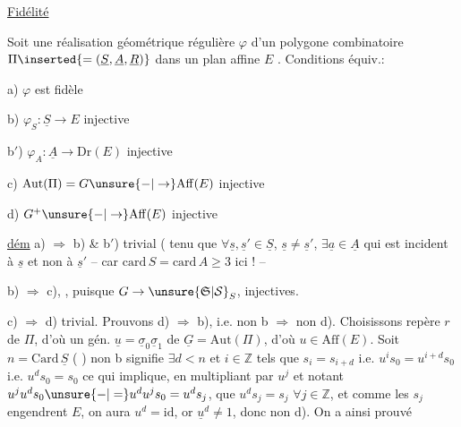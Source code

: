 \begin{center}\uline{Fidélité}\end{center}

  Soit une réalisation géométrique
régulière $\varphi$  d'un polygone combinatoire
$\Pi\inserted{=(\underline S,\underline A,\underline R)}$ dans un plan affine $E$ . Conditions équiv.:

a) $\varphi$ est fidèle

b) $\varphi_S:\underline S\to E$ injective

b$'$) $\varphi_A:\underline A\to\mathrm{Dr}(E)$ injective

c) $\mathrm{Aut}(\Pi)=G\unsure{-|\to}\mathrm{Aff}(E)$ injective

d) 
 $G^+\unsure{-|\to}\mathrm{Aff}(E)$ injective

\uline{dém} a) $\Rightarrow$ b) \& b$'$) trivial ( tenu que
$\forall\underline s,\underline s'\in\underline S$, $\underline s\ne\underline s'$, $\exists\underline a\in\underline A$ qui est incident à $\underline s$ et
non à $\underline s'$ -- car $\mathrm{card}\,S=\mathrm{card}\,A\geq3$ ici ! -- 

b) $\Rightarrow$ c),  , puisque $G\to\unsure{\mathfrak S|\mathcal S}_S$,  injectives.

 c) $\Rightarrow$ d) trivial. Prouvons
d) $\Rightarrow$ b), i.e. non b $\Rightarrow$ non d). Choisissons
 repère $r$ de $\Pi$, d'où un gén.
 $\underline u=\underline\sigma_0\underline\sigma_1$ de $\underline G=\mathrm{Aut}(\Pi)$, d'où $u\in\mathrm{Aff}(E)$.
 Soit $n=\mathrm{Card}\,\underline S$ ( )
  non b signifie $\exists d<n$ 
 et $i\in\mathbb Z$ tels que $s_i=s_{i+d}$ i.e.
$u^is_0=u^{i+d}s_0$ i.e.  $u^ds_0=s_0$ ce qui
implique, en multipliant par $u^j$ et
notant $u^ju^ds_0\unsure{-|=}u^du^js_0=u^ds_j$, que
$u^ds_j=s_j$ $\forall j\in\mathbb Z$, et comme les $s_j$ engendrent
$E$, on aura $u^{d}=\mathrm{id}$,  or $\underline u^d\ne1$, donc
non d). On a ainsi prouvé
